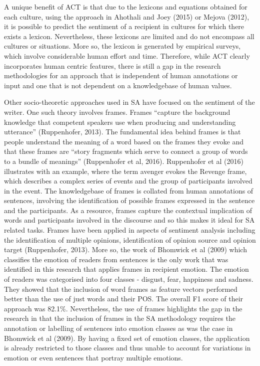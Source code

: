 A unique benefit of ACT is that due to the lexicons and equations obtained for each culture, using the approach in Ahothali and Joey (2015) or Mejova (2012), it is possible to predict the sentiment of a recipient in cultures for which there exists a lexicon. Nevertheless, these lexicons are limited and do not encompass all cultures or situations. More so, the lexicon is generated by empirical surveys, which involve considerable human effort and time. Therefore, while ACT clearly incorporates human centric features, there is still a gap in the research methodologies for an approach that is independent of human annotations or input and one that is not dependent on a knowledgebase of human values.  


Other socio-theoretic approaches used in SA have focused on the sentiment of the writer. One such theory involves frames. Frames ``capture the background knowledge that competent speakers use when producing and understanding utterance'' (Ruppenhofer, 2013). The fundamental idea behind frames is that people understand the meaning of a word based on the frames they evoke and that these frames are ``story fragments which serve to connect a group of words to a bundle of meanings'' (Ruppenhofer et al, 2016). Ruppenhofer et al (2016) illustrates with an example, where the term avenger evokes the Revenge frame, which describes a complex series of events and the group of participants involved in the event. The knowledgebase of frames is collated from human annotations of sentences, involving the identification of possible frames expressed in the sentence and the participants. As a resource, frames capture the contextual implication of words and participants involved in the discourse and so this makes it ideal for SA related tasks. Frames have been applied in aspects of sentiment analysis including the identification of multiple opinions, identification of opinion source and opinion target (Ruppenhofer, 2013). More so, the work of Bhomwick et al (2009) which classifies the emotion of readers from sentences is the only work that was identified in this research that applies frames in recipient emotion. The emotion of readers was categorised into four classes - disgust, fear, happiness and sadness. They showed that the inclusion of word frames as feature vectors performed better than the use of just words and their POS. The overall F1 score of their approach was 82.1\%. Nevertheless, the use of frames highlights the gap in the research in that the inclusion of frames in the SA methodology requires the annotation or labelling of sentences into emotion classes as was the case in Bhomwick et al (2009). By having a fixed set of emotion classes, the application is already restricted to those classes and thus unable to account for variations in emotion or even sentences that portray multiple emotions.


